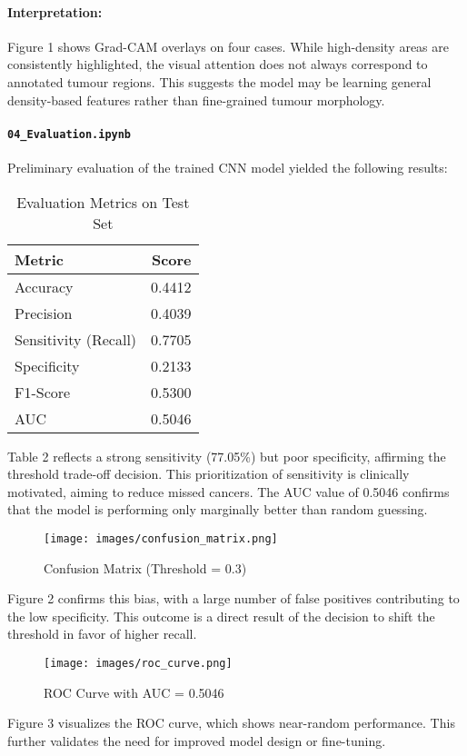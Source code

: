 \documentclass[12pt]{article}
\begin{document}
\paragraph{Interpretation:}
Figure 1 shows Grad-CAM overlays on four cases. While high-density areas are consistently highlighted, the visual attention does not always correspond to annotated tumour regions. This suggests the model may be learning general density-based features rather than fine-grained tumour morphology.

\paragraph{\texttt{04\_Evaluation.ipynb}}
Preliminary evaluation of the trained CNN model yielded the following results:

\begin{table}[H]
\centering
\caption{Evaluation Metrics on Test Set}
\begin{tabular}{lr}
\toprule
Metric & Score \\
\midrule
Accuracy & 0.4412 \\
Precision & 0.4039 \\
Sensitivity (Recall) & 0.7705 \\
Specificity & 0.2133 \\
F1-Score & 0.5300 \\
AUC & 0.5046 \\
\bottomrule
\end{tabular}
\end{table}

Table 2 reflects a strong sensitivity (77.05\%) but poor specificity, affirming the threshold trade-off decision. This prioritization of sensitivity is clinically motivated, aiming to reduce missed cancers. The AUC value of 0.5046 confirms that the model is performing only marginally better than random guessing.

\begin{figure}[H]
\centering
\texttt{[image: images/confusion\_matrix.png]}
\caption{Confusion Matrix (Threshold = 0.3)}
\end{figure}
Figure 2 confirms this bias, with a large number of false positives contributing to the low specificity. This outcome is a direct result of the decision to shift the threshold in favor of higher recall.

\begin{figure}[H]
\centering
\texttt{[image: images/roc\_curve.png]}
\caption{ROC Curve with AUC = 0.5046}
\end{figure}
Figure 3 visualizes the ROC curve, which shows near-random performance. This further validates the need for improved model design or fine-tuning.
\end{document}
